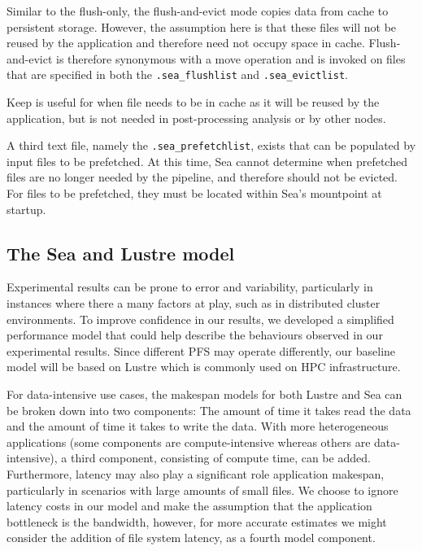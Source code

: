 \documentclass[10pt,journal,compsoc]{IEEEtran}
\begin{document}
Similar to the flush-only, the flush-and-evict mode copies data from cache to
persistent storage. However, the assumption here is that these files will not be
reused by the application and therefore need not occupy space in cache.
Flush-and-evict is therefore synonymous with a move operation and is invoked on
files that are specified in both the \texttt{.sea\_flushlist} and
\texttt{.sea\_evictlist}.


Keep is useful for when file needs to be in cache as it will be reused by the
application, but is not needed in post-processing analysis or by other nodes.

A third text file, namely the \texttt{.sea\_prefetchlist}, exists that can be populated by input
files to be prefetched. At this time, Sea cannot determine when prefetched files are no longer needed by the pipeline, and
therefore should not be evicted. For files to be prefetched, they must be located within Sea's mountpoint at startup.


\subsection{The Sea and Lustre model}\label{ss:sea-comp:model}

      Experimental results can be prone to error and variability, particularly
      in instances where there a many factors at play, such as in distributed cluster
      environments. To improve confidence in our results, we developed a
      simplified performance model that could help describe the behaviours observed in our experimental
      results. Since different PFS may
      operate differently, our baseline model will be based on Lustre which is
      commonly used on HPC infrastructure.

      For data-intensive use cases, the makespan models for both Lustre and Sea
      can be broken down into two components: The amount of time it takes read
      the data and the amount of time it takes to write the data. With more
      heterogeneous applications (some components are compute-intensive whereas
      others are data-intensive), a third component, consisting of compute time,
      can be added. Furthermore, latency may also play a significant role
      application makespan, particularly in scenarios with large amounts of
      small files. We choose to ignore latency costs in our model and make the
      assumption that the application bottleneck is the bandwidth, however, for
      more accurate estimates we might consider the addition of file system
      latency, as a fourth model component.
\end{document}

